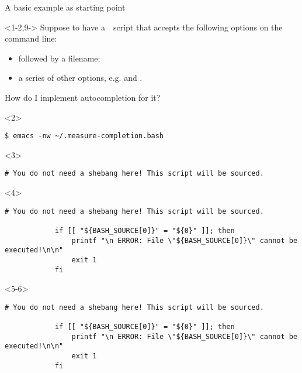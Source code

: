 \begin{frame}[fragile]{A basic example as starting point}
    \vspace{-1mm}
    \begin{onlyenv}<1-2,9->
        Suppose to have a \,\, script that accepts the following options on the command line:
        \begin{itemize}
            \item {} followed by a filename;
            \item a series of other options, e.g.  and .
        \end{itemize}
        How do I implement autocompletion for it?
        \begin{onlyenv}<2>
            \begin{lstlisting}[style=myBash, numbers=none, aboveskip=4mm]
                $ emacs -nw ~/.measure-completion.bash
            \end{lstlisting}
        \end{onlyenv}
    \end{onlyenv}
    \begin{onlyenv}<3>
        \begin{lstlisting}[style=myBash, numbers=none, style=smaller]
            # You do not need a shebang here! This script will be sourced.
        \end{lstlisting}
    \end{onlyenv}
    \begin{onlyenv}<4>
        \begin{lstlisting}[style=myBash, numbers=none, style=smaller]
            # You do not need a shebang here! This script will be sourced.

            if [[ "${BASH_SOURCE[0]}" = "${0}" ]]; then
                printf "\n ERROR: File \"${BASH_SOURCE[0]}\" cannot be executed!\n\n"
                exit 1
            fi
        \end{lstlisting}
    \end{onlyenv}
    \begin{onlyenv}<5-6>
        \begin{lstlisting}[style=myBash, numbers=none, style=smaller]
            # You do not need a shebang here! This script will be sourced.

            if [[ "${BASH_SOURCE[0]}" = "${0}" ]]; then
                printf "\n ERROR: File \"${BASH_SOURCE[0]}\" cannot be executed!\n\n"
                exit 1
            fi


\end{lstlisting}
\end{onlyenv}
\end{frame}
